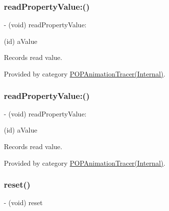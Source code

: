 \subsubsection{\texorpdfstring{read\+Property\+Value\+:()}{readPropertyValue:()}\hspace{0.1cm}{\footnotesize\ttfamily [1/2]}}
{\footnotesize\ttfamily -\/ (void) read\+Property\+Value\+: \begin{DoxyParamCaption}\item[{(id)}]{a\+Value }\end{DoxyParamCaption}}

Records read value. 

Provided by category \mbox{\hyperlink{category_p_o_p_animation_tracer_07_internal_08_a219ed8a35e2d3fa997e5688386572f15}{P\+O\+P\+Animation\+Tracer(\+Internal)}}.

\mbox{\label{interface_p_o_p_animation_tracer_a219ed8a35e2d3fa997e5688386572f15}} 
\subsubsection{\texorpdfstring{read\+Property\+Value\+:()}{readPropertyValue:()}\hspace{0.1cm}{\footnotesize\ttfamily [2/2]}}
{\footnotesize\ttfamily -\/ (void) read\+Property\+Value\+: \begin{DoxyParamCaption}\item[{(id)}]{a\+Value }\end{DoxyParamCaption}}

Records read value. 

Provided by category \mbox{\hyperlink{category_p_o_p_animation_tracer_07_internal_08_a219ed8a35e2d3fa997e5688386572f15}{P\+O\+P\+Animation\+Tracer(\+Internal)}}.

\mbox{\label{interface_p_o_p_animation_tracer_af539c16668e279fc6100f346bfe2d710}} 
\subsubsection{\texorpdfstring{reset()}{reset()}\hspace{0.1cm}{\footnotesize\ttfamily [1/3]}}
{\footnotesize\ttfamily -\/ (void) reset \begin{DoxyParamCaption}{ }\end{DoxyParamCaption}}

